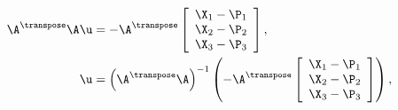 \begin{align}
\A^\transpose \A \u & = -\A^\transpose 
\left[\begin{array}{c}
  \X_1-\P_1 \\
  \X_2-\P_2 \\
  \X_3-\P_3
\end{array}\right]
, \\
\u & = \left(\A^\transpose \A\right)^{-1} \left(-\A^\transpose
\left[\begin{array}{c}
  \X_1-\P_1 \\
  \X_2-\P_2 \\
  \X_3-\P_3
\end{array}\right]
\right),
\end{align}
